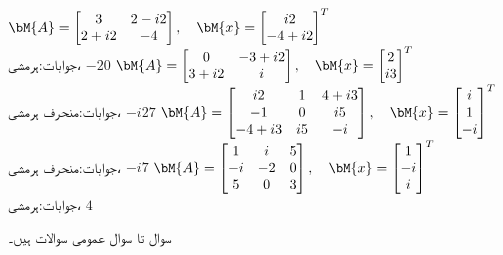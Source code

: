 \quad 
$\bM{A}=\begin{bmatrix} 3&2-i2\\2+i2&-4 \end{bmatrix},\quad \bM{x}=\begin{bmatrix} i2\\-4+i2 \end{bmatrix}^T$\\
جوابات:ہرمشی،
 $-20$
\quad 
$\bM{A}=\begin{bmatrix} 0&-3+i2\\3+i2&i \end{bmatrix},\quad \bM{x}=\begin{bmatrix} 2\\i3 \end{bmatrix}^T$\\
جوابات:منحرف ہرمشی،
 $-i27$
\quad 
$\bM{A}=\begin{bmatrix}i2&1&4+i3\\-1&0&i5\\-4+i3&i5&-i \end{bmatrix},\quad \bM{x}=\begin{bmatrix} i\\1\\-i \end{bmatrix}^T$\\
جوابات:منحرف ہرمشی،
 $-i7$
\quad 
$\bM{A}=\begin{bmatrix}1&i&5\\-i&-2&0\\5&0&3\end{bmatrix},\quad \bM{x}=\begin{bmatrix} 1\\-i\\i \end{bmatrix}^T$\\
جوابات:ہرمشی،
 $4$

سوال  تا سوال  عمومی سوالات ہیں۔

